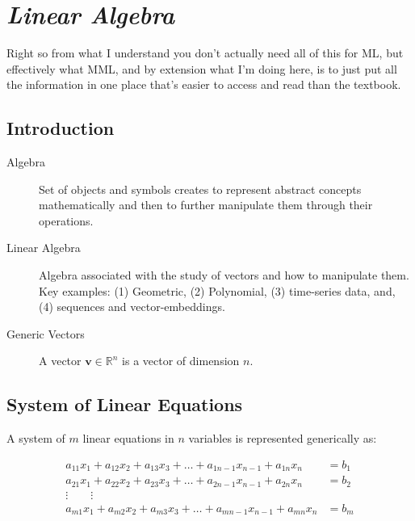 \chapter{\textit{Linear Algebra}}

Right so from what I understand you don't actually need all of this for ML, but effectively what MML, and by extension what I'm doing here, is to just put all the information in one place that's easier to access and read than the textbook.

\section{Introduction}

\begin{description}
    \item[Algebra] Set of objects and symbols creates to represent abstract concepts mathematically and then to further manipulate them through their operations. 
    \item[Linear Algebra] Algebra associated with the study of vectors and how to manipulate them. Key examples: (1) Geometric, (2) Polynomial, (3) time-series data, and, (4) sequences and vector-embeddings. 
    \item[Generic Vectors] A vector $\bm{v} \in \mathbb{R}^n$ is a vector of dimension $n$. 
\end{description}

\section{System of Linear Equations}

A system of $m$ linear equations in $n$ variables is represented generically as:

\begin{equation}
    \begin{aligned}
        a_{11}x_1 + a_{12}x_2 + a_{13}x_3 + \hdots + a_{1n-1}x_{n-1} + a_{1n}x_n &= b_1 \\
        a_{21}x_1 + a_{22}x_2 + a_{23}x_3 + \hdots + a_{2n-1}x_{n-1} + a_{2n}x_n &= b_2 \\
        \vdots \quad \quad \vdots \\
        a_{m1}x_1 + a_{m2}x_2 + a_{m3}x_3 + \hdots + a_{mn-1}x_{n-1} + a_{mn}x_n &= b_m \\
    \end{aligned}
    \label{eq:generic-sys-lin-eq}
\end{equation}

